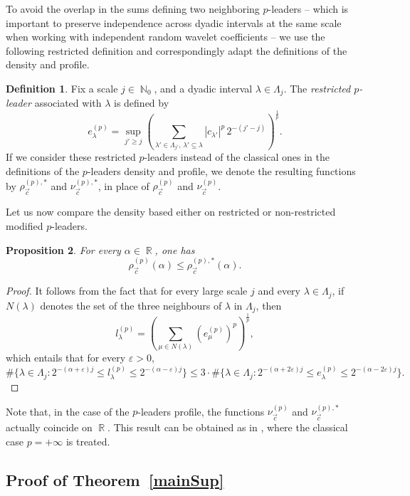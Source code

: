 \documentclass[a4paper,11pt,oneside]{article}
\DeclareMathOperator{\R}{\mathbb{R}}
\DeclareMathOperator{\N}{\mathbb{N}}
\newcommand{\modu}[1]{\left\vert{#1}\right\vert}
\theoremstyle{definition}
\newtheorem{defi}{Definition}[section]
\theoremstyle{plain}
\newtheorem{prop}[defi]{Proposition}
\begin{document}
To avoid the overlap in the sums defining two neighboring $p$-leaders -- which is important to preserve independence across dyadic intervals at the same scale when working with independent random wavelet coefficients -- we use the following restricted definition and correspondingly adapt the definitions of the density and profile.

\begin{defi}
Fix a scale $j\in\N_0$, and a dyadic interval $\lambda\in\Lambda_j$. The \textit{restricted $p$-leader} associated with $\lambda$ is defined by
\[
e_\lambda^{(p)}=\sup_{j'\geq j}\left(\sum_{\lambda'\in\Lambda_{j'},\,\lambda'\subseteq \lambda}\modu{c_{\lambda'}}^p\,2^{-(j'-j)}\right)^{\frac{1}{p}}.
\]
If we consider these restricted $p$-leaders instead of the classical ones in the definitions of the $p$-leaders density and profile, we denote the resulting functions by $\rho_{\vec{c}}^{(p),\ast}$ and $\nu_{\vec{c}}^{(p),\ast}$, in place of $\rho_{\vec{c}}^{(p)}$ and $\nu_{\vec{c}}^{(p)}$.
\end{defi}

Let us now compare the density based either on restricted or non-restricted modified $p$-leaders.

\begin{prop}\label{class_restr}
For every $\alpha\in\R$, one has
\[
\rho_{\vec{c}}^{(p)}(\alpha)\leq\rho_{\vec{c}}^{(p),\ast}(\alpha).
\]
\end{prop}

\begin{proof}
It follows from the fact that for every large scale $j$ and every $\lambda\in\Lambda_j$, if $N(\lambda)$ denotes the set of the three neighbours of $\lambda$ in $\Lambda_j$, then
\[
l_\lambda^{(p)}=\left(\sum_{\mu\in N(\lambda)}\left(e_\mu^{(p)}\right)^p\right)^{\frac{1}{p}},
\]
which entails that for every $\varepsilon>0$, 
\[
\#\{\lambda\in\Lambda_j:2^{-(\alpha+\varepsilon)j}\leq 
l_\lambda^{(p)}\leq2^{-(\alpha-\varepsilon)j}\} \leq 3\cdot\#\{\lambda\in\Lambda_j:2^{-(\alpha+2\varepsilon)j}\leq e_\lambda^{(p)}\leq2^{-(\alpha-2\varepsilon)j}\}.
\]
\end{proof}

Note that, in the case of the $p$-leaders profile, the functions $\nu_{\vec{c}}^{(p)}$ and $\nu_{\vec{c}}^{(p),\ast}$  actually coincide on $\R$. This result can be obtained as in \cite{largeDev}, where the classical case  $p=+\infty$ is treated.



\subsection{Proof of Theorem~\ref{mainSup}}\label{secSup2}
\end{document}
